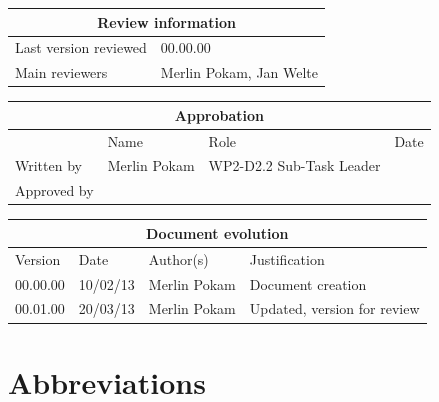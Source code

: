 \documentclass{template/openetcs_report}
\begin{document}
\begin{tabular}{|p{4.4cm}|p{8.7cm}|}
\hline
\multicolumn{2}{|c|}{Review information} \\
\hline
Last version reviewed & 00.00.00 \\
\hline
Main reviewers & Merlin Pokam, Jan Welte \\
\hline
\end{tabular}

\begin{tabular}{|p{2.2cm}|p{4cm}|p{4cm}|p{2cm}|}
\hline
\multicolumn{4}{|c|}{Approbation} \\
\hline
  &  Name & Role & Date   \\
\hline  
Written by    &  Merlin Pokam & WP2-D2.2 Sub-Task Leader  & \\
\hline
Approved by &  &  & \\
\hline
\end{tabular}

\begin{tabular}{|p{2.2cm}|p{2cm}|p{3cm}|p{5cm}|}
\hline
\multicolumn{4}{|c|}{Document evolution} \\
\hline
Version &  Date & Author(s) & Justification  \\
\hline  
00.00.00 & 10/02/13 & Merlin Pokam &  Document creation  \\
\hline  
00.01.00 & 20/03/13 & Merlin Pokam &  Updated, version for review  \\
\hline
\end{tabular}



\tableofcontents
\listoffiguresandtables




\chapter{Abbreviations}
\end{document}
